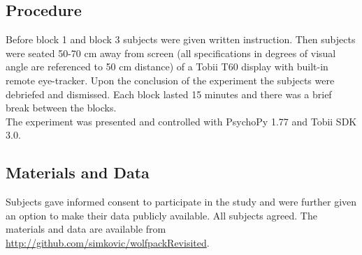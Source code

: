 \documentclass[10pt]{article}
\begin{document}
\subsection*{Procedure}
Before block 1 and block 3 subjects were given written instruction.
Then subjects were seated 50-70 cm away from screen (all specifications in degrees of visual angle are referenced to 50 cm distance) of a Tobii T60 display with built-in remote eye-tracker. 
Upon the conclusion of the experiment the subjects were debriefed and dismissed. 
Each block lasted 15 minutes and there was a brief break between the blocks.\\
The experiment was presented and controlled with PsychoPy 1.77 \cite{peirce07} and Tobii SDK 3.0. 

\subsection*{Materials and Data}
Subjects gave informed consent to participate in the study and were further given an option to make their data publicly available. 
All subjects agreed. 
The materials and data are available from\\ \url{http://github.com/simkovic/wolfpackRevisited}. 
\end{document}
